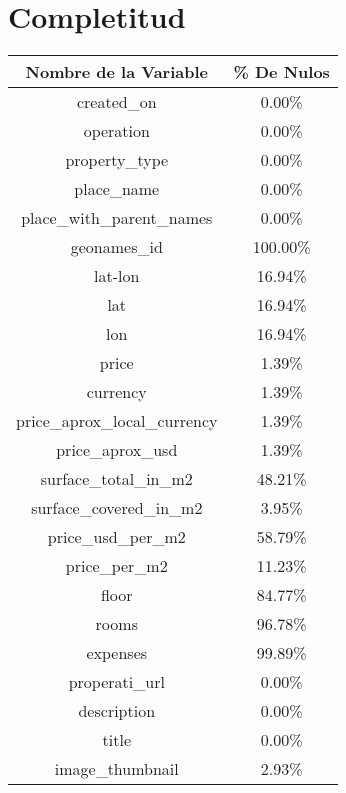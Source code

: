 \documentclass{report}
\begin{document}
    \section{Completitud}
    \begin{center}
    \begin{tabular}{||c|c||} 
        \hline
        Nombre de la Variable & \% De Nulos \\
        \hline\hline
        created\_on & 0.00\%\\
        \hline
        operation & 0.00\%\\
        \hline
        property\_type & 0.00\%\\
        \hline
        place\_name & 0.00\%\\
        \hline
        place\_with\_parent\_names & 0.00\%\\
        \hline
        geonames\_id 	& 	100.00\%\\
        \hline
        lat-lon & 16.94\%\\
        \hline
        lat & 16.94\%\\
        \hline
        lon & 16.94\%\\
        \hline
        price & 1.39\%\\
        \hline
        currency & 1.39\%\\
        \hline
        price\_aprox\_local\_currency & 1.39\%\\
        \hline
        price\_aprox\_usd             &   1.39\%\\
        \hline
        surface\_total\_in\_m2     &      48.21\%\\
        \hline
        surface\_covered\_in\_m2    &      3.95\%\\
        \hline
        price\_usd\_per\_m2 	& 	58.79\%\\
        \hline
        price\_per\_m2             &     11.23\%\\
        \hline
        floor 	& 	84.77\%\\
        \hline
        rooms 	& 	96.78\%\\
        \hline
        expenses 	& 	99.89\%\\
        \hline
        properati\_url            &      0.00\%\\
        \hline
        description               &     0.00\%\\
        \hline
        title                      &    0.00\%\\
        \hline
        image\_thumbnail             &   2.93\%\\
        \hline
 
    \end{tabular}
    \end{center}
    
\end{document}
